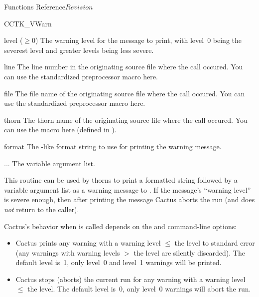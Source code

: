 \begin{cactuspart}{ Functions Reference}{}{$Revision$}
\begin{FunctionDescription}{CCTK\_VWarn}
\begin{ParameterSection}
\begin{Parameter}{level ($\ge 0$)}
The warning level for the message to print, with level~0 being the
severest level and greater levels being less severe.
\end{Parameter}
\begin{Parameter}{line}
The line number in the originating source file where the  call
occured. You can use the standardized  preprocessor macro here.
\end{Parameter}
\begin{Parameter}{file}
The file name of the originating source file where the  call
occured. You can use the standardized  preprocessor macro here.
\end{Parameter}
\begin{Parameter}{thorn}
The thorn name of the originating source file where the  call occured. You can use the  macro here (defined in ).
\end{Parameter}
\begin{Parameter}{format}
The -like format string to use for printing the warning message.
\end{Parameter}
\begin{Parameter}{...}
The variable argument list.
\end{Parameter}
\end{ParameterSection}

\begin{Discussion}
This routine can be used by thorns to print a formatted string followed
by a variable argument list as a warning message to .  If
the message's ``warning level'' is severe enough, then after printing
the message Cactus aborts the run (and  does {\em not\/}
return to the caller).

Cactus's behavior when  is called depends on the
 and  command-line options:
\begin{itemize}
\item   Cactus prints any warning with a warning level $\le$
        the  level to standard error (any warnings with
        warning levels $>$ the  level are silently discarded).
        The default  level is~1, \ie{} only level~0 and level~1
        warnings will be printed.
\item   Cactus stops (aborts) the current run for any warning
        with a warning level $\le$ the  level.
        The default  level is~0, \ie{} only level~0
        warnings will abort the run.
\end{itemize}


\end{Discussion}
\end{FunctionDescription}
\end{cactuspart}

